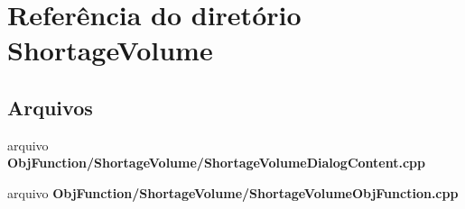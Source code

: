 \section{Referência do diretório Shortage\+Volume}
\label{dir_8dee4fdcd6c2dfa6219f35c020640e97}
\subsection*{Arquivos}
\begin{DoxyCompactItemize}
\item 
arquivo {\bf Obj\+Function/\+Shortage\+Volume/\+Shortage\+Volume\+Dialog\+Content.\+cpp}
\item 
arquivo {\bf Obj\+Function/\+Shortage\+Volume/\+Shortage\+Volume\+Obj\+Function.\+cpp}
\end{DoxyCompactItemize}
